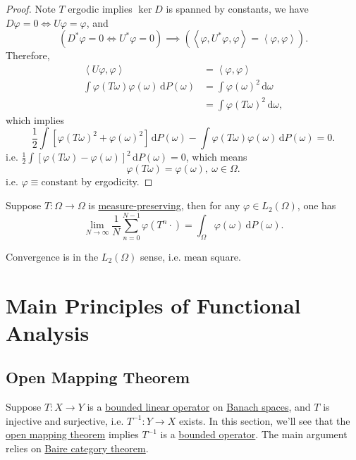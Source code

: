 \begin{proof}
	Note \(T\) ergodic implies \(\ker{D}\) is spanned by constants, we have \(D \varphi = 0 \Leftrightarrow U\varphi = \varphi\), and
	\[
		(D^{\ast} \varphi = 0 \Leftrightarrow U^{\ast} \varphi = 0) \implies (\left\langle \varphi, U^{\ast} \varphi, \varphi \right\rangle  = \left\langle \varphi, \varphi \right\rangle ).
	\]
	Therefore,
	\begin{align*}
		\left\langle U \varphi, \varphi \right\rangle                 & = \left\langle \varphi, \varphi \right\rangle   \\
		\int \varphi(T \omega) \varphi(\omega) \,\mathrm{d} P(\omega) & =\int \varphi(\omega)^2 \,\mathrm{d} \omega     \\
		                                                              & = \int \varphi(T \omega)^2 \,\mathrm{d} \omega,
	\end{align*}
	which implies
	\[
		\frac{1}{2} \int [\varphi(T \omega)^2 + \varphi(\omega)^2] \,\mathrm{d} P(\omega) - \int \varphi(T \omega) \varphi(\omega) \,\mathrm{d} P(\omega) = 0.
	\]
	i.e. \(\frac{1}{2} \int[\varphi(T \omega) - \varphi(\omega)]^2 \,\mathrm{d} P(\omega) = 0\), which means
	\[
		\varphi(T \omega) = \varphi(\omega),\ \omega \in \Omega.
	\]
	i.e. \(\varphi \equiv \text{constant}\) by ergodicity.
\end{proof}

\begin{theorem}\label{von-Newmann-ergodic}
	Suppose \(T\colon \Omega \to \Omega\) is \hyperref[def:measure-preserving]{measure-preserving}, then for any \(\varphi \in L_2(\Omega)\), one has
	\[
		\lim_{N \to \infty} \frac{1}{N} \sum_{n=0}^{N-1} \varphi(T^n \cdot) = \int_\Omega \varphi(\omega) \,\mathrm{d} P(\omega).
	\]
\end{theorem}
\begin{remark}
	Convergence is in the \(L_2(\Omega)\) sense, i.e. mean square.
\end{remark}

\chapter{Main Principles of Functional Analysis}

\section{Open Mapping Theorem}

Suppose \(T\colon X \to Y\) is a \hyperref[def:bounded-linear-op]{bounded linear operator} on \hyperref[def:Banach-space]{Banach spaces}, and \(T\) is injective and surjective, i.e. \(T^{-1}\colon Y \to X\) exists. In this section, we'll see that the \hyperref[def:open-mapping]{open mapping theorem} implies \(T^{-1}\) is a \hyperref[rmk:bounded-op]{bounded operator}. The main argument relies on \href{https://en.wikipedia.org/wiki/Baire_category_theorem}{Baire category theorem}.

